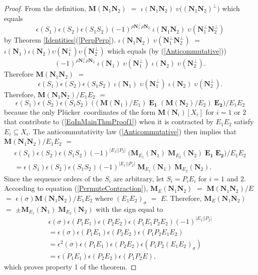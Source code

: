 \documentclass[12pt]{article}
\theoremstyle{definition}
\newcommand{\Is}{\ensuremath{\iota}}
\newcommand{\Vs}{\ensuremath{\upsilon}}
\newcommand{\Card}[1]{\ensuremath{{\left|#1\right|}}}
\newcommand{\ext}[1]{\ensuremath{\mathbf{#1}}}
\newcommand{\Plucker}{Pl\"{u}cker\ }
\begin{document}
\begin{proof}
From the definition, $\ext{M}(\ext{N}_1\ext{N}_2)$ $=$
$\Is(\ext{N}_1\ext{N}_2)\;\Vs\big((\ext{N}_1\ext{N}_2)^\perp\big)$
which equals
\[
\epsilon(S_1)\epsilon(S_2)\epsilon(S_1S_2)
(-1)^{\rho\ext{N}_1^\perp\rho\ext{N}_2}\;
\Is(\ext{N}_1\ext{N}_2)\;\Vs(\ext{N}_1^\perp\ext{N}_2^\perp)
\]
by Theorem \ref{Identities}(\ref{PerpPerp}).
$\Is(\ext{N}_1\ext{N}_2)\;\Vs(\ext{N}_1^\perp\ext{N}_2^\perp)$ $=$
$\Is(\ext{N}_1)\Is(\ext{N}_2)\Vs(\ext{N}_1^\perp)\Vs(\ext{N}_2^\perp)$
which equals (by (\ref{Anticommutative}))
\[
(-1)^{\rho\ext{N}_1^\perp\rho\ext{N}_2}
\;\Is(\ext{N}_1)\;\Vs(\ext{N}_1^\perp)\;\Is(\ext{N}_2)\;\Vs(\ext{N}_2^\perp).
\]
Therefore $\ext{M}(\ext{N}_1\ext{N}_2)$ $=$
\begin{equation}
\label{EqInMainThmProof1}
\epsilon(S_1)\epsilon(S_2)\epsilon(S_1S_2)
\;\Is(\ext{N}_1)\;\Vs(\ext{N}_1^\perp)\;\Is(\ext{N}_2)\;\Vs(\ext{N}_2^\perp).
\end{equation}
Therefore, 
$\ext{M}(\ext{N}_1\ext{N}_2)/E_1E_2$ $=$
\[
\epsilon(S_1)\epsilon(S_2)\epsilon(S_1S_2)\;
\big((\ext{M}(\ext{N}_1)/E_1)\;\ext{E_1}\;
(\ext{M}(\ext{N}_2)/E_2)\;\ext{E_2}\big)/E_1E_2
\]
because the only \Plucker coordinates of the form
$\ext{M}(\ext{N}_i)[X_i]$ for $i=1$ or $2$ that 
contribute to (\ref{EqInMainThmProof1}) when it is contracted
by $E_1E_2$ satisfy $E_i\subseteq X_i$.  
The anticommutativity law 
(\ref{Anticommutative}) then
implies that $\ext{M}(\ext{N}_1\ext{N}_2)/E_1E_2$ $=$
\begin{equation*}
\begin{split}
\epsilon(S_1)\epsilon(S_2)\epsilon(S_1S_2)(-1)^{\Card{E_1}\Card{P_2}}
\;\big(\ext{M}_{E_1}(\ext{N}_1)\;
 \ext{M}_{E_2}(\ext{N}_2)\;\ext{E_1}\;\ext{E_2}\big)/E_1E_2\\
=\epsilon(S_1)\epsilon(S_2)\epsilon(S_1S_2)(-1)^{\Card{E_1}\Card{P_2}}
\;\ext{M}_{E_1}(\ext{N}_1)\;\ext{M}_{E_2}(\ext{N}_2).
\end{split}
\end{equation*}
Since the sequence orders of the $S_i$ are arbitrary, let $S_i=P_iE_i$ for $i=1$ 
and $2$.
According to equation (\ref{PermuteContraction}),
$\ext{M}_E(\ext{N}_1\ext{N}_2)$ $=$ $\ext{M}(\ext{N}_1\ext{N}_2)/E$ $=$
$\epsilon(\sigma)\ext{M}(\ext{N}_1\ext{N}_2)/E_1E_2$ where $(E_1E_2)_\sigma$
$=$ $E$.  Therefore, $\ext{M}_E(\ext{N}_1\ext{N}_2)$ $=$
$\pm\ext{M}_{E_1}(\ext{N}_1)\;\ext{M}_{E_2}(\ext{N}_2)$ 
with the sign equal to
\begin{equation*}
\begin{split}
\epsilon(\sigma)
\epsilon(P_1E_1)\epsilon(P_2E_2)\epsilon(P_1E_1P_2E_2)
(-1)^{\Card{E_1}\Card{P_2}}\\
=
\epsilon(\sigma)
\epsilon(P_1E_1)\epsilon(P_2E_2)\epsilon(P_1P_2E_1E_2)\\
=
\epsilon^2(\sigma)
\epsilon(P_1E_1)\epsilon(P_2E_2)\epsilon(P_1P_2(E_1E_2)_\sigma)\\
=
\epsilon(P_1E_1)\epsilon(P_2E_2)\epsilon(P_1P_2E),
\end{split}
\end{equation*}
which proves property 1 of the theorem.


\end{proof}
\end{document}
